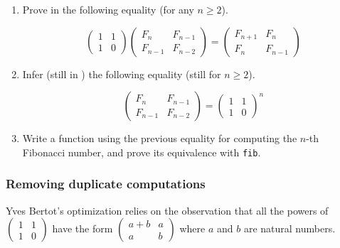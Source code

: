 
\begin{exercise}
  \label{exercise:fibmat}
  \begin{enumerate}
  \item 

Prove in \coq{} the following equality (for any $n\geq 2$). \label{fibmat-eq1}

\[
\left(
  \begin{array}{cc}
    1 & 1 \\
    1 & 0 
  \end{array}
\right)
\left(
  \begin{array}{cc}
    F_{n}& F_{n-1} \\
    F_{n-1} & F_{n-2}
  \end{array}
\right)
=
\left(
  \begin{array}{cc}
    F_{n+1}& F_{n} \\
    F_{n} & F_{n-1} 
  \end{array}
\right)
\]
  
\item Infer (still in \coq{}) the following equality (still for $n\geq 2$).



\[
\left(
  \begin{array}{cc}
    F_{n}& F_{n-1} \\
    F_{n-1} & F_{n-2} 
  \end{array}
\right)
= 
\left(
  \begin{array}{cc}
    1 & 1 \\
    1 & 0 
  \end{array}
\right)^n
\]

\item Write a function using the previous equality for computing the $n$-th Fibonacci number, and prove its equivalence with \texttt{fib}.

\end{enumerate}
\end{exercise}

\subsubsection{Removing duplicate computations}
\label{sect:fibonacci-mul2}


Yves Bertot's optimization relies on the observation that all the powers of
\(  \left(
  \begin{array}{cc}
    1 & 1 \\
    1 & 0 
  \end{array}
\right) \) have the form 
\(  \left(
  \begin{array}{cc}
    a+b  & a \\
    a & b
  \end{array}
\right) \) where $a$ and $b$ are natural numbers.

